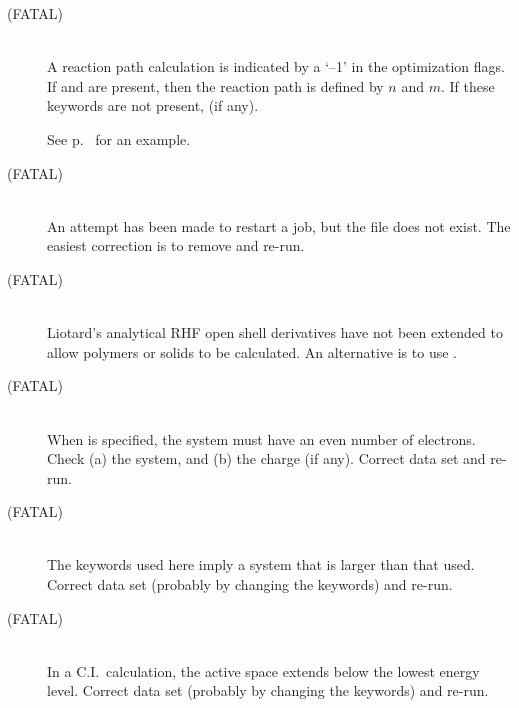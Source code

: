 \begin{description}
\item[ (FATAL)]~\\
A reaction path calculation is indicated by a `--1' in the optimization
flags.  If  and  are present, then the
reaction path is defined by $n$ and $m$.  If these keywords are not
present,  (if any). 
\begin{latexonly}
See p.~\pageref{sn2} for an example.
\end{latexonly}

\item[ (FATAL)]~\\
An attempt has been made to restart a job, but the 
file does not exist.  The easiest correction is to remove 
and re-run.


\item[ (FATAL)]~\\
Liotard's analytical RHF open shell derivatives have not been extended to allow
polymers or solids to be calculated.  An alternative is to use .

\item[ (FATAL)]~\\
When  is specified, the system must have an even number of  
electrons.  Check (a) the system, and (b) the charge (if any).  Correct 
data set and re-run. 
 
\item[ (FATAL)]~\\
The keywords used here imply a system that is larger than that used.
Correct data set (probably by changing the keywords) and re-run.

\item[ (FATAL)]~\\
In a C.I.\ calculation, the active space extends below the lowest energy level.
Correct data set (probably by changing the keywords) and re-run. 


\end{description}
